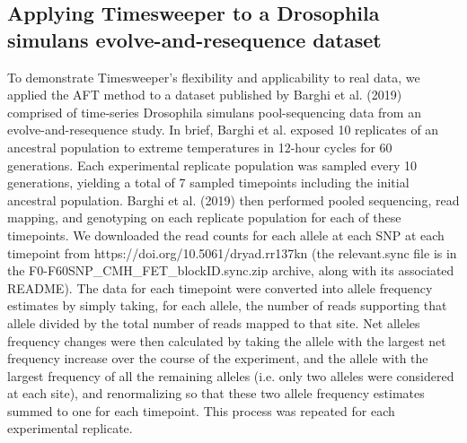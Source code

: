 \subsection{Applying Timesweeper to a Drosophila simulans evolve-and-resequence dataset}
To demonstrate Timesweeper’s flexibility and applicability to real data, we applied the AFT method to a dataset published by Barghi et al. (2019) comprised of time-series Drosophila simulans pool-sequencing data from an evolve-and-resequence study. In brief, Barghi et al. exposed 10 replicates of an ancestral population to extreme temperatures in 12-hour cycles for 60 generations. Each experimental replicate population was sampled every 10 generations, yielding a total of 7 sampled timepoints including the initial ancestral population. Barghi et al. (2019) then performed pooled sequencing, read mapping, and genotyping on each replicate population for each of these timepoints. We downloaded the read counts for each allele at each SNP at each timepoint from https://doi.org/10.5061/dryad.rr137kn (the relevant.sync file is in the F0-F60SNP\_CMH\_FET\_blockID.sync.zip archive, along with its associated README). The data for each timepoint were converted into allele frequency estimates by simply taking, for each allele, the number of reads supporting that allele divided by the total number of reads mapped to that site. Net alleles frequency changes were then calculated by taking the allele with the largest net frequency increase over the course of the experiment, and the allele with the largest frequency of all the remaining alleles (i.e. only two alleles were considered at each site), and renormalizing so that these two allele frequency estimates summed to one for each timepoint. This process was repeated for each experimental replicate. 

